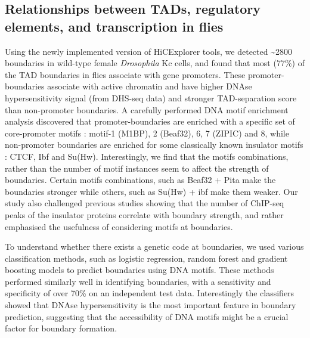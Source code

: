 \documentclass[11pt,twoside]{MPIthesis}
\theoremstyle{definition}
\theoremstyle{definition}
\theoremstyle{definition}
\theoremstyle{remark}
\begin{document}
\clearpage

\subsection{Relationships between TADs, regulatory elements, and
transcription in
flies}\label{relationships-between-tads-regulatory-elements-and-transcription-in-flies}

Using the newly implemented version of HiCExplorer tools, we detected
\textasciitilde{}2800 boundaries in wild-type female \emph{Drosophila}
Kc cells, and found that most (77\%) of the TAD boundaries in flies
associate with gene promoters. These promoter-boundaries associate with
active chromatin and have higher DNAse hypersensitivity signal (from
DHS-seq data) and stronger TAD-separation score than non-promoter
boundaries. A carefully performed DNA motif enrichment analysis
discovered that promoter-boundaries are enriched with a specific set of
core-promoter motifs : motif-1 (M1BP), 2 (Beaf32), 6, 7 (ZIPIC) and 8,
while non-promoter boundaries are enriched for some classically known
insulator motifs : CTCF, Ibf and Su(Hw). Interestingly, we find that the
motifs combinations, rather than the number of motif instances seem to
affect the strength of boundaries. Certain motifs combinations, such as
Beaf32 + Pita make the boundaries stronger while others, such as Su(Hw)
+ ibf make them weaker. Our study also challenged previous studies
showing that the number of ChIP-seq peaks of the insulator proteins
correlate with boundary strength, and rather emphasised the usefulness
of considering motifs at boundaries.

To understand whether there exists a genetic code at boundaries, we used
various classification methods, such as logistic regression, random
forest and gradient boosting models to predict boundaries using DNA
motifs. These methods performed similarly well in identifying
boundaries, with a sensitivity and specificity of over 70\% on an
independent test data. Interestingly the classifiers showed that DNAse
hypersensitivity is the most important feature in boundary prediction,
suggesting that the accessibility of DNA motifs might be a crucial
factor for boundary formation.
\end{document}
